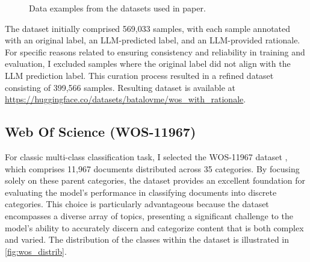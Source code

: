 \begin{figure}[hbt]
    \centering
    \begin{subfigure}[t]{.5\linewidth}
        \centering
        
    \end{subfigure}%
    \begin{subfigure}[t]{.5\linewidth}
        \centering
        
    \end{subfigure}

    \caption{Data examples from the datasets used in \citeauthor{stepbystep} \cite{stepbystep} paper.}
    \label{fig:rationale_dataset}
\end{figure}

The dataset initially comprised 569,033 samples, with each sample annotated with an original label, an LLM-predicted label, and an LLM-provided rationale. For specific reasons related to ensuring consistency and reliability in training and evaluation, I excluded samples where the original label did not align with the LLM prediction label. This curation process resulted in a refined dataset consisting of 399,566 samples. Resulting dataset is available at \linebreak \url{https://huggingface.co/datasets/batalovme/wos_with_rationale}.

\subsection{Web Of Science (WOS-11967)}

For classic multi-class classification task, I selected the WOS-11967 dataset \cite{wos}, which comprises 11,967 documents distributed across 35 categories. By focusing solely on these parent categories, the dataset provides an excellent foundation for evaluating the model’s performance in classifying documents into discrete categories. This choice is particularly advantageous because the dataset encompasses a diverse array of topics, presenting a significant challenge to the model's ability to accurately discern and categorize content that is both complex and varied. The distribution of the classes within the dataset is illustrated in \autoref{fig:wos_distrib}.


